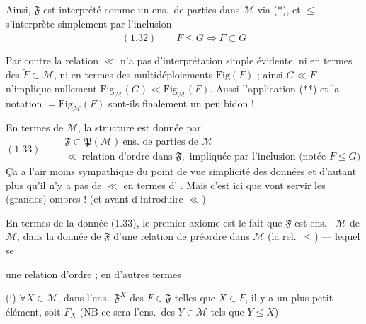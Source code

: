 \documentclass[11pt,a4paper]{article}
\begin{document}
Ainsi, $\mathfrak{F}$ est interprété comme un ens.\ de parties dans $\mathcal{M}$ via (*), et $\leq$ s'interprète simplement par l'inclusion
\[
  (1.32) \qquad F \leq G \iff \widetilde{F} \subset \widetilde{G}
\]

Par contre la relation $\ll$ n'a pas d'interprétation simple évidente, ni en termes des  $\widetilde{F} \subset \mathcal{M}$, ni en termes des multidéploiements $\mathrm{Fig}(F)$ ; ainsi $G \ll F$ n'implique nullement $\mathrm{Fig}_{\mathcal{M}}(G) \ll \mathrm{Fig}_{\mathcal{M}}(F)$. Aussi l'application (**) et la notation $= \mathrm{Fig}_{\mathcal{M}}(F)$ sont-ils finalement un peu bidon !

En termes de $\mathcal{M}$, la structure est donnée par
\[
  (1.33) \qquad
  \boxed{
  \begin{array}{l}
    \mathfrak{F} \subset \mathfrak{P}(\mathcal{M}) \ \text{ens.\ de parties de } \mathcal{M} \\
    \ll \ \text{relation d'ordre dans } \mathfrak{F}, \text{ impliquée par l'inclusion (notée } F \leq G)
  \end{array}}
\]
Ça a l'air moins sympathique du point de vue simplicité des données et d'autant plus qu'il n'y a pas   de $\ll$ en termes d'\struck{\ill{}}  \ill{}. Mais c'est ici que vont servir les (grandes) ombres ! (et avant d'introduire $\ll$)

En termes de la  donnée (1.33), le \struck{\ill{}} premier axiome est \struck{\ill{}} le fait que $\mathfrak{F}$ est   ens.\   $\mathcal{M}$ de   $\mathcal{M}$,  dans la donnée de $\mathfrak{F}$   d'une relation de préordre dans $\mathcal{M}$ (la rel.\ $\leq$) — lequel se

une relation d'ordre ; en d'autres termes

(i) $\forall X \in \mathcal{M}$, dans l'ens.\ $\mathfrak{F}^{X}$ des $F \in \mathfrak{F}$ telles que $X \in F$, il y a un plus petit élément, soit $F_X$ (NB ce sera l'ens.\ des $Y \in \mathcal{M}$ tels que $Y \leq X$)
\end{document}
